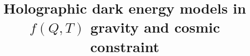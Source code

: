\documentclass[manuscript]{aastex631}
\begin{document}
\title{Holographic dark energy models in $f(Q,T)$ gravity and cosmic constraint}


\end{document}
